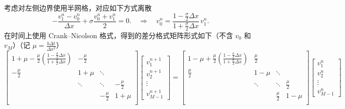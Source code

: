 考虑对左侧边界使用半网格，对应如下方式离散
\[
    - \frac{v_1^n - v_{0}^n}{\Delta x} + \sigma \frac{v_0^n + v_1^n}2 = 0.\quad\Rightarrow\quad v_0^{n} = \frac{1-\frac{\sigma}2 \Delta x}{1 +\frac{\sigma}2 \Delta x}\, v_1^{n}.
\]
在时间上使用 Crank–Nicolson 格式，得到的差分格式矩阵形式如下（不含 $v_0$ 和 $v_{M}$）（记 $\mu = \frac{b \Delta t}{\Delta x^2}$）
{\small\[
    \begin{bmatrix}
        1+\mu - \frac{\mu}{2}\left(\frac{1-\frac{\sigma}2 \Delta x}{1 +\frac{\sigma}2 \Delta x}\right) & -\frac{\mu}2 &              &              \\
        -\frac{\mu}2                                                                                   & 1+\mu        & \ddots       &              \\
                                                                                                       & \ddots       & \ddots       & -\frac{\mu}2 \\
                                                                                                       &              & -\frac{\mu}2 & 1+\mu        \\
    \end{bmatrix}
    \begin{bmatrix}
        v_1^{n+1} \\ v_2^{n+1} \\ \vdots  \\ v_{M-1}^{n+1}
    \end{bmatrix}
    =
    \begin{bmatrix}
        1 -\mu + \frac{\mu}{2}\left(\frac{1-\frac{\sigma}2 \Delta x}{1 +\frac{\sigma}2 \Delta x}\right) & \frac{\mu}2 &             &             \\
        \frac{\mu}2                                                                                     & 1-\mu       & \ddots      &             \\
                                                                                                        & \ddots      & \ddots      & \frac{\mu}2 \\
                                                                                                        &             & \frac{\mu}2 & 1-\mu       \\
    \end{bmatrix}
    \begin{bmatrix}
        v_1^{n} \\ v_2^{n} \\ \vdots  \\ v_{M-1}^{n}
    \end{bmatrix}
\]}

